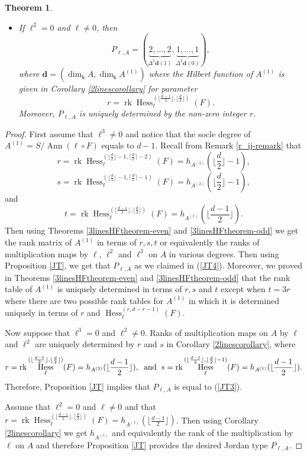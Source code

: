 \documentclass[12pt]{amsart}
\numberwithin{equation}{section}
\theoremstyle{plain} \newtheorem{theorem}{Theorem}[section]
\theoremstyle{definition} \newtheorem{definition}[theorem]{Definition}
\DeclareMathOperator{\Hess}{Hess}\DeclareMathOperator{\rk}{rk}
\DeclareMathOperator{\ann}{Ann}\DeclareMathOperator{\Char}{char}
\begin{document}
\begin{theorem}
\begin{itemize}
\item If $\ell^2=0$ and $\ell\neq 0$, then 
\begin{equation}\label{JT2}
P_{\ell,A}=(\underbrace{2,\dots ,2}_{\Delta^2\mathbf{d}(1)},\underbrace{1,\dots ,1}_{\Delta^2\mathbf{d}(0)}),
\end{equation}
where $\mathbf{d}=(\dim_\mathsf{k} A,\dim_\mathsf{k} A^{(1)})$ 
where the Hilbert function of $A^{(1)}$ is given in Corollary \ref{2linescorollary} for parameter $$r=\rk\Hess_\ell^{(\lfloor\frac{d-1}{2}\rfloor, \lfloor\frac{d}{2}\rfloor)}(F).$$
Moreover, $P_{\ell,A}$ is uniquely determined by the non-zero integer $r.$
\end{itemize}
\end{theorem}
\begin{proof}
First assume that $\ell^3\neq 0$ and notice that the socle degree of  $A^{(1)}=S/\ann(\ell\circ F)$ equals to $d-1$. Recall from Remark \ref{r_ij-remark} that
$$r=\rk\Hess_\ell^{(\lfloor\frac{d}{2}\rfloor-1,\lceil\frac{d}{2}\rceil-2 )}(F)= h_{A^{(3)}}(\lfloor\frac{d}{2}\rfloor-1), $$
$$s=\rk\Hess_\ell^{(\lfloor\frac{d}{2}\rfloor-1,\lceil\frac{d}{2}\rceil-1 )}(F)= h_{A^{(2)}}(\lfloor\frac{d}{2}\rfloor-1), $$
and 
$$t=\rk\Hess_\ell^{(\lfloor\frac{d-1}{2}\rfloor,\lfloor\frac{d}{2}\rfloor )}(F)= h_{A^{(1)}}(\lfloor\frac{d-1}{2}\rfloor).$$
Then using Theorems  \ref{3linesHFtheorem-even} and \ref{3linesHFtheorem-odd} we get the rank matrix of $A^{(1)}$ in terms of $r,s,t$ or equivalently the ranks of multiplication maps by $\ell$,  $\ell^2$ and $\ell^3$ on $A$ in various degrees. Then using Proposition \ref{JT}, we get that $P_{\ell,A}$ as we claimed in  (\ref{JT4}). Moreover, we proved in Theorems  \ref{3linesHFtheorem-even} and \ref{3linesHFtheorem-odd} that the rank table of $A^{(1)}$ is uniquely determined in terms of $r,s$ and $t$ except when $t=3r$ where there are two possible rank tables for $A^{(1)}$ in which it is determined uniquely in terms of $r$ and $\Hess_\ell^{(r,d-r-1)}(F)$.

Now suppose that $\ell^3=0$ and $\ell^2\neq 0$. Ranks of multiplication maps on $A$ by $\ell$ and $\ell^2$ are uniquely determined by $r$ and $s$ in Corollary \ref{2linescorollary}, where 
$$r=\rk\Hess_\ell^{(\lfloor\frac{d-1}{2}\rfloor, \lfloor\frac{d}{2}\rfloor)}(F)=h_{A^{(2)}}(\lfloor\frac{d-1}{2}\rfloor),\hspace*{2mm} \text{and} \hspace*{2mm}  s=\rk\Hess_\ell^{(\lfloor\frac{d-1}{2}\rfloor, \lfloor\frac{d}{2}\rfloor-1)}(F)=h_{A^{(1)}}(\lfloor\frac{d-1}{2}\rfloor).$$ Therefore, Proposition \ref{JT} implies that $P_{\ell,A}$ is equal to (\ref{JT3}).

Assume that $\ell^2=0$ and $\ell\neq 0$ and that $r=\rk\Hess_\ell^{(\lfloor\frac{d-1}{2}\rfloor, \lfloor\frac{d}{2}\rfloor)}(F)=h_{A^{(1)}}(\lfloor\frac{d-1}{2}\rfloor)$.  Then using Corollary \ref{2linescorollary} we get $h_{A^{(1)}}$ and equivalently the rank of the multiplication by $\ell$ on $A$ and therefore Proposition \ref{JT} provides the desired Jordan type $P_{\ell,A}$.
\end{proof}
\end{document}
